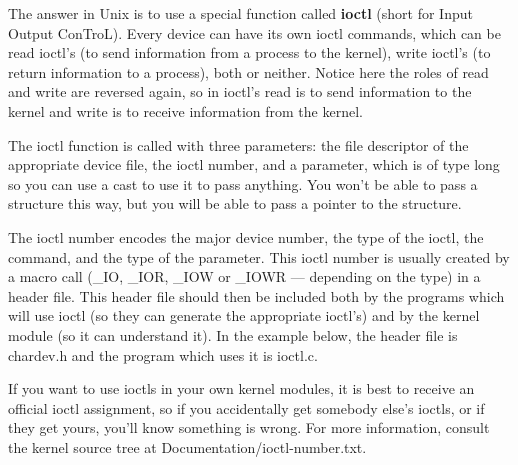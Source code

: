 \documentclass[11pt]{article}
\begin{document}
The answer in Unix is to use a special function called \textbf{ioctl} (short for Input Output ConTroL). Every device can have its own ioctl commands, which can be read ioctl's (to send information from a process to the kernel), write ioctl's (to return information to a process), both or neither. Notice here the roles of read and write are reversed again, so in ioctl's read is to send information to the kernel and write is to receive information from the kernel.

The ioctl function is called with three parameters: the file descriptor of the appropriate device file, the ioctl number, and a parameter, which is of type long so you can use a cast to use it to pass anything. You won't be able to pass a structure this way, but you will be able to pass a pointer to the structure.

The ioctl number encodes the major device number, the type of the ioctl, the command, and the type of the parameter. This ioctl number is usually created by a macro call (\_IO, \_IOR, \_IOW or \_IOWR --- depending on the type) in a header file. This header file should then be included both by the programs which will use ioctl (so they can generate the appropriate ioctl's) and by the kernel module (so it can understand it). In the example below, the header file is chardev.h and the program which uses it is ioctl.c.

If you want to use ioctls in your own kernel modules, it is best to receive an official ioctl assignment, so if you accidentally get somebody else's ioctls, or if they get yours, you'll know something is wrong. For more information, consult the kernel source tree at Documentation/ioctl-number.txt.
\end{document}
